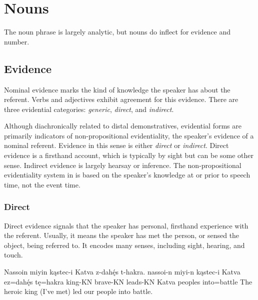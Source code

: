 \setchapterpreamble[u]{\margintoc}
\chapter{Nouns}
The \langname{} noun phrase is largely analytic, but nouns do inflect for evidence and number.

\section{Evidence} \label{sec:evidence}
Nominal evidence marks the kind of knowledge the speaker has about the referent. Verbs and adjectives exhibit agreement for this evidence. There are three evidential categories: \emph{generic}, \emph{direct}, and \emph{indirect}.

Although diachronically related to distal demonstratives, evidential forms are primarily indicators of non-propositional evidentiality,  the speaker's evidence of a nominal referent. Evidence in this sense is either \emph{direct} or \emph{indirect}. Direct evidence is a firsthand account, which is typically by sight but can be some other sense. Indirect evidence is largely hearsay or inference. The non-propositional evidentiality system in \langname{} is based on the speaker's knowledge at or prior to speech time, not the event time.

\subsection{Direct}
Direct evidence signals that the speaker has personal, firsthand experience with the referent. Usually, it means the speaker has met the person, or sensed the object, being referred to. It encodes many senses, including sight, hearing, and touch.

\begin{example}
    \script Nassoin miyin kąstec-i Katva z-dahę́s t-hakra.
    \bits nassoi-n miyi-n kąstec-i {Katva ez=dahę́s} tę=hakra
    \gloss king-KN brave-KN leads-KN {Katva peoples} into=battle
    \tr The heroic king (I've met) led our people into battle.
\end{example}

